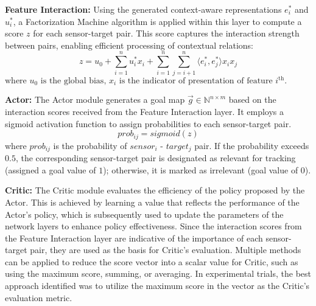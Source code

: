 \documentclass[preprint,12pt]{elsarticle}
\begin{document}

\noindent\textbf{Feature Interaction:} Using the generated context-aware representations $e^*_i$ and $u^*_i$, a Factorization Machine algorithm is applied within this layer to compute a score $z$ for each sensor-target pair. This score captures the interaction strength between pairs, enabling efficient processing of contextual relations: 
\begin{equation}
z = u_0 + \sum_{i=1}^{n} u_i^* x_i + \sum_{i=1}^{n} \sum_{j=i+1}^{n} \langle e_i^* , e_j^* \rangle x_i x_j
\end{equation}
$\text{where } u_0 \text{ is the global bias, } x_i \text{ is the indicator of presentation of feature } i^{\text{th}}.$

%     
\noindent\textbf{Actor:} The Actor module generates a goal map $\overset{\rightarrow}{g}\in\mathbb{N}^{n\times m} $ based on the interaction scores received from the Feature Interaction layer. It employs a sigmoid activation function to assign probabilities to each sensor-target pair. 
\begin{equation}
    prob_{ij} = sigmoid(z)
\end{equation}
where $prob_{ij}$ is the probability of $sensor_i$ - $target_j$ pair.
If the probability exceeds $0.5$, the corresponding sensor-target pair is designated as relevant for tracking (assigned a goal value of $1$); otherwise, it is marked as irrelevant (goal value of $0$). 


\noindent\textbf{Critic:} The Critic module evaluates the efficiency of the policy proposed by the Actor. This is achieved by learning a value that reflects the performance of the Actor's policy, which is subsequently used to update the parameters of the network layers to enhance policy effectiveness. Since the interaction scores from the Feature Interaction layer are indicative of the importance of each sensor-target pair, they are used as the basis for Critic's evaluation. Multiple methods can be applied to reduce the score vector into a scalar value for Critic, such as using the maximum score, summing, or averaging. In experimental trials, the best approach identified was to utilize the maximum score in the vector as the Critic's evaluation metric. 
\end{document}
